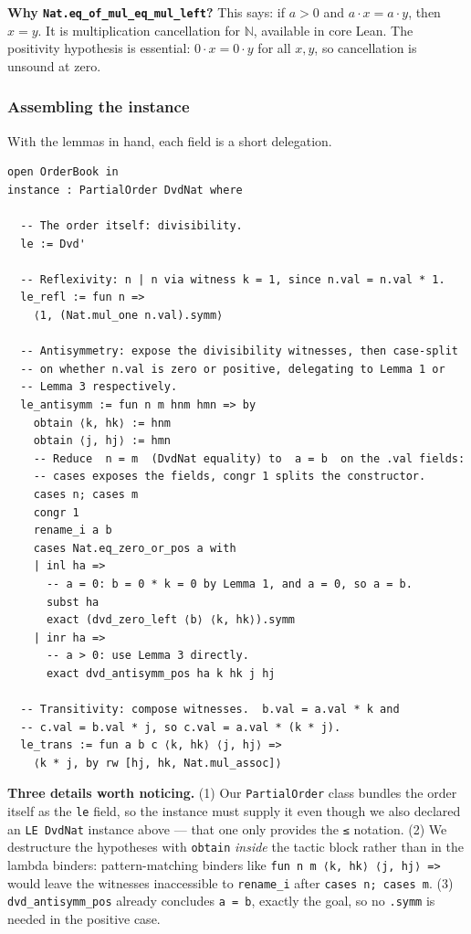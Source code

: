 \documentclass[12pt, a4paper, openright]{book}
\theoremstyle{thmstyle}
\theoremstyle{defstyle}
\newcommand{\lc}[1]{\texttt{#1}}
\newenvironment{notebox}{%
  \begin{tcolorbox}[notebox]%
}{\end{tcolorbox}}
\begin{document}
\begin{notebox}
  \textbf{Why \lc{Nat.eq\_of\_mul\_eq\_mul\_left}?}
  This says: if $a > 0$ and $a \cdot x = a \cdot y$, then $x = y$.
  It is multiplication cancellation for $\mathbb{N}$, available in core Lean.
  The positivity hypothesis is essential: $0 \cdot x = 0 \cdot y$ for all
  $x, y$, so cancellation is unsound at zero.
\end{notebox}

\subsubsection{Assembling the instance}

With the lemmas in hand, each field is a short delegation.

\begin{verbatim}
open OrderBook in
instance : PartialOrder DvdNat where

  -- The order itself: divisibility.
  le := Dvd'

  -- Reflexivity: n | n via witness k = 1, since n.val = n.val * 1.
  le_refl := fun n =>
    ⟨1, (Nat.mul_one n.val).symm⟩

  -- Antisymmetry: expose the divisibility witnesses, then case-split
  -- on whether n.val is zero or positive, delegating to Lemma 1 or
  -- Lemma 3 respectively.
  le_antisymm := fun n m hnm hmn => by
    obtain ⟨k, hk⟩ := hnm
    obtain ⟨j, hj⟩ := hmn
    -- Reduce  n = m  (DvdNat equality) to  a = b  on the .val fields:
    -- cases exposes the fields, congr 1 splits the constructor.
    cases n; cases m
    congr 1
    rename_i a b
    cases Nat.eq_zero_or_pos a with
    | inl ha =>
      -- a = 0: b = 0 * k = 0 by Lemma 1, and a = 0, so a = b.
      subst ha
      exact (dvd_zero_left ⟨b⟩ ⟨k, hk⟩).symm
    | inr ha =>
      -- a > 0: use Lemma 3 directly.
      exact dvd_antisymm_pos ha k hk j hj

  -- Transitivity: compose witnesses.  b.val = a.val * k and
  -- c.val = b.val * j, so c.val = a.val * (k * j).
  le_trans := fun a b c ⟨k, hk⟩ ⟨j, hj⟩ =>
    ⟨k * j, by rw [hj, hk, Nat.mul_assoc]⟩
\end{verbatim}

\begin{notebox}
  \textbf{Three details worth noticing.}
  (1) Our \lc{PartialOrder} class bundles the order itself as the \lc{le}
  field, so the instance must supply it even though we also declared an
  \lc{LE DvdNat} instance above --- that one only provides the \lc{≤}
  notation.
  (2) We destructure the hypotheses with \lc{obtain} \emph{inside} the
  tactic block rather than in the lambda binders: pattern-matching binders
  like \lc{fun n m ⟨k, hk⟩ ⟨j, hj⟩ =>} would leave the witnesses
  inaccessible to \lc{rename\_i} after \lc{cases n; cases m}.
  (3) \lc{dvd\_antisymm\_pos} already concludes \lc{a = b}, exactly the
  goal, so no \lc{.symm} is needed in the positive case.
\end{notebox}
\end{document}
